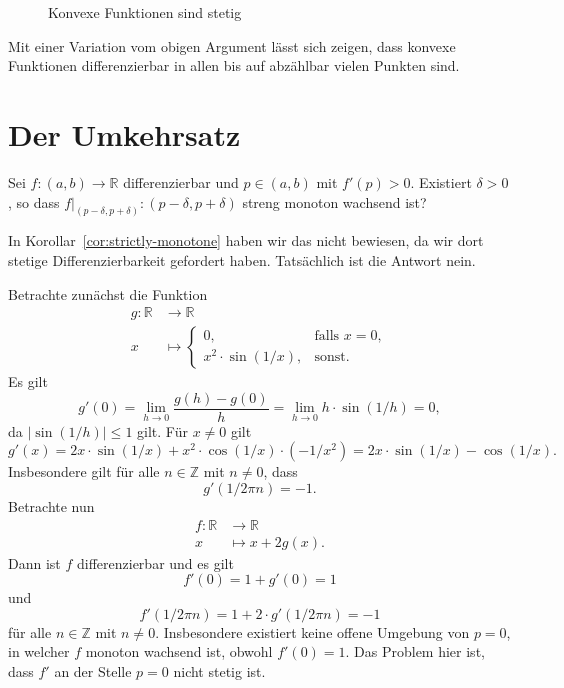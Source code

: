 \documentclass[../main.tex]{subfiles}
\begin{document}
\begin{figure}[htb]
  \centering
  
  \caption{Konvexe Funktionen sind stetig}%
  \label{fig:convex-continuous}
\end{figure}

Mit einer Variation vom obigen Argument lässt sich zeigen,
dass konvexe Funktionen differenzierbar in allen
bis auf abzählbar vielen Punkten sind.

\section{Der Umkehrsatz}
\begin{question}
  Sei $f \colon (a, b) \to \mathbb{R}$ differenzierbar
  und $p \in (a, b)$ mit $f'(p) > 0$.
  Existiert $\delta > 0$, so dass
  $f|_{(p - \delta, p + \delta)} \colon
  (p - \delta, p + \delta)$ streng monoton wachsend ist?
\end{question}

In Korollar~\ref{cor:strictly-monotone} haben wir das
nicht bewiesen, da wir dort stetige
Differenzierbarkeit gefordert haben.
Tatsächlich ist die Antwort nein.

\begin{example}
  Betrachte zunächst die Funktion
  \begin{align*}
    g \colon \mathbb{R} & \to \mathbb{R} \\
    x & \mapsto
    \begin{cases}
      0, & \text{falls $x = 0$}, \\
      x^2 \cdot \sin(1/x), & \text{sonst}.
    \end{cases}
  \end{align*}
Es gilt
\[
  g'(0) = \lim_{h \to 0} \frac{g(h) - g(0)}{h}
  = \lim_{h \to 0} h \cdot \sin(1/h) = 0,
\]
da $|\sin(1/h)| \leq 1$ gilt.
Für $x \neq 0$ gilt
\[
  g'(x) = 2x \cdot \sin(1/x) + x^2 \cdot \cos(1/x) \cdot (-1/x^2)
  = 2x \cdot \sin(1/x) - \cos (1/x).
\]
Insbesondere gilt für alle $n \in \mathbb{Z}$ mit
$n \neq 0$, dass
\[
  g'(1/2\pi n) = -1.
\]
Betrachte nun
\begin{align*}
  f \colon \mathbb{R} & \to \mathbb{R} \\
  x & \mapsto x + 2g(x).
\end{align*}
Dann ist $f$ differenzierbar und es gilt
\[
  f'(0) = 1 + g'(0) = 1
\]
und
\[
  f'(1/2 \pi n) = 1 + 2 \cdot g'(1/ 2 \pi n) = -1
\]
für alle $n \in \mathbb{Z}$ mit $n \neq 0$.
Insbesondere existiert keine offene
Umgebung von $p = 0$,
in welcher $f$ monoton wachsend ist,
obwohl $f'(0) = 1$.
Das Problem hier ist, dass
$f'$ an der Stelle $p = 0$ nicht stetig ist.
\end{example}
\end{document}
